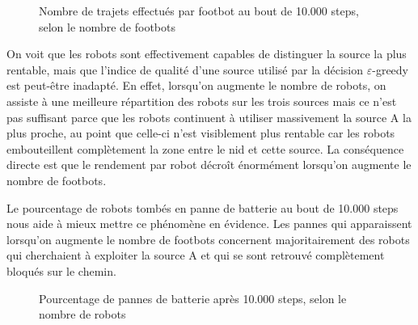 \begin{figure}[htbp]
\centering
{}
\caption{Nombre de trajets effectués par footbot au bout de 10.000 steps, selon le nombre de footbots}
\end{figure}

On voit que les robots sont effectivement capables de distinguer la source la plus rentable, mais que l'indice de qualité d'une source utilisé par la décision $\varepsilon$-greedy est peut-être inadapté. En effet, lorsqu'on augmente le nombre de robots, on assiste à une meilleure répartition des robots sur les trois sources mais ce n'est pas suffisant parce que les robots continuent à utiliser massivement la source A la plus proche, au point que celle-ci n'est visiblement plus rentable car les robots embouteillent complètement la zone entre le nid et cette source. La conséquence directe est que le rendement par robot décroît énormément lorsqu'on augmente le nombre de footbots.

Le pourcentage de robots tombés en panne de batterie au bout de 10.000 steps nous aide à mieux mettre ce phénomène en évidence. Les pannes qui apparaissent lorsqu'on augmente le nombre de footbots concernent majoritairement des robots qui cherchaient à exploiter la source A et qui se sont retrouvé complètement bloqués sur le chemin.

\begin{figure}[htbp]
\centering
{}
\caption{Pourcentage de pannes de batterie après 10.000 steps, selon le nombre de robots}
\end{figure}

